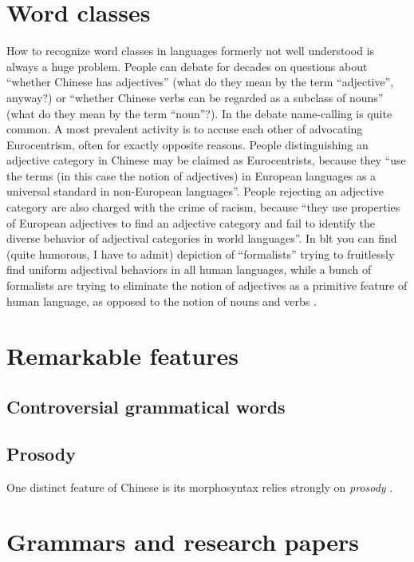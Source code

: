 \section{Word classes}\label{sec:word-class-intro}

How to recognize word classes in languages formerly not well understood is always a huge problem.
People can debate for decades on questions about ``whether Chinese has adjectives'' (what do they mean 
by the term ``adjective'', anyway?) or ``whether Chinese verbs can be regarded as a subclass of nouns''
(what do they mean by the term ``noun''?). In the debate name-calling is quite common. 
A most prevalent activity is to accuse each other of 
advocating Eurocentrism, often for exactly opposite reasons. People distinguishing an adjective 
category in Chinese may be claimed as Eurocentrists, because they ``use the terms (in this case 
the notion of adjectives) in European languages as a universal standard in non-European languages''.
People rejecting an adjective category are also charged with the crime of racism, because 
``they use properties of European adjectives to find an adjective category and fail to identify 
the diverse behavior of adjectival categories in world languages''. In \ac{blt} you can find 
(quite humorous, I have to admit) depiction of ``formalists'' trying to fruitlessly find uniform adjectival 
behaviors in all human languages, while a bunch of formalists are trying to eliminate the 
notion of adjectives as a primitive feature of human language, as opposed to the notion of nouns and verbs \citep{Mitrovi2020}.

\section{Remarkable features}

\subsection{Controversial grammatical words}

\subsection{Prosody}\label{sec:prosody-intro}

One distinct feature of Chinese is its morphosyntax relies strongly on \emph{prosody} \citep{feng2013}. 


\section{Grammars and research papers}

